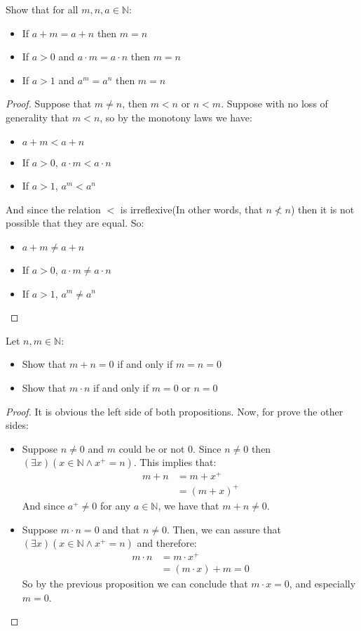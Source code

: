 \documentclass{tufte-handout}
\begin{document}
\begin{problem}
	Show that for all $m, n, a \in \mathbb{N}$:
	\begin{itemize}
		\item If $a + m = a + n$ then $m = n$
		\item If $a > 0$ and $a \cdot m = a\cdot n$ then $m = n$
		\item If $a > 1$ and $a^m = a^n$ then $m = n$
	\end{itemize}
\end{problem}
\begin{proof}
	Suppose that $m \neq n$, then $m < n$ or $n < m$. Suppose with no loss of generality that $m < n$, so by the monotony laws we have:
	\begin{itemize}
		\item $a + m < a + n$
		\item If $a > 0$, $a \cdot m < a \cdot n$
		\item If $a > 1$, $a^m < a^n$
	\end{itemize}
	And since the relation $<$ is irreflexive(In other words, that $n \not < n$) then it is not possible that they are equal. So:
	\begin{itemize}
		\item $a + m \neq a + n$
		\item If $a > 0$, $a \cdot m \neq a \cdot n$
		\item If $a > 1$, $a^m \neq a^n$
	\end{itemize}
\end{proof}

\begin{problem}
	Let $n, m \in \mathbb{N}$:
	\begin{itemize}
		\item Show that $m + n = 0$ if and only if $m = n = 0$
		\item Show that $m \cdot n$ if and only if $m = 0$ or $n = 0$
	\end{itemize}
\end{problem}
\begin{proof}
	It is obvious the left side of both propositions. Now, for prove the other sides:
	\begin{itemize}
		\item Suppose $n \neq 0$ and $m$ could be or not $0$. Since $n \neq 0$ then $(\exists x)(x \in \mathbb{N} \wedge x^+ = n)$. This implies that:
		\begin{align*}
			m + n &= m + x^+\\
			&= (m + x)^+
		\end{align*}
		And since $a^+ \neq 0$ for any $a \in \mathbb{N}$, we have that $m + n \neq 0$.
		\item Suppose $m \cdot n = 0$ and that $n \neq 0$. Then, we can assure that $(\exists x)(x\in \mathbb{N} \wedge x^+ = n)$ and therefore:
		\begin{align*}
			m \cdot n &= m \cdot x^+\\
			&= (m \cdot x) + m = 0
		\end{align*}
		So by the previous proposition we can conclude that $m \cdot x = 0$, and especially $m = 0$.
	\end{itemize}
\end{proof}
\end{document}
